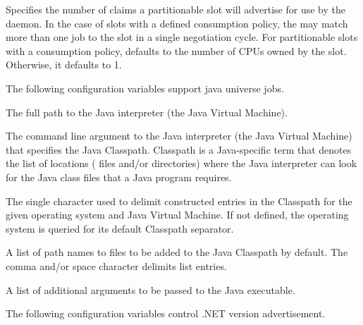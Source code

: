 \begin{description}
\label{param:NumClaims}
\item[\Macro{NUM\_CLAIMS}]
  Specifies the number of claims a partitionable slot will advertise for use
  by the  daemon.  
  In the case of slots with a defined
  consumption policy, the  may match more than one 
  job to the slot in a single negotiation cycle.  
  For partitionable slots with a consumption
  policy,  defaults to the number of CPUs 
  owned by the slot.  
  Otherwise, it defaults to 1.

\end{description}


The following configuration variables support java universe jobs.

\begin{description}
\label{param:Java}
\item[\Macro{JAVA}]
  The full path to the Java interpreter (the Java Virtual Machine).

\label{param:JavaClasspathArgument}
\item[\Macro{JAVA\_CLASSPATH\_ARGUMENT}]
  The command line argument to the Java interpreter (the Java Virtual Machine)
  that specifies the Java Classpath.
  Classpath is a Java-specific term that denotes the list of
  locations ( files and/or directories)
  where the Java interpreter can
  look for the Java class files that a Java program requires.

\label{param:JavaClasspathSeparator}
\item[\Macro{JAVA\_CLASSPATH\_SEPARATOR}]
  The single character used to delimit constructed entries in the
  Classpath for the given operating system and Java Virtual Machine.
  If not defined, the operating system is queried for its default
  Classpath separator.

\label{param:JavaClasspathDefault}
\item[\Macro{JAVA\_CLASSPATH\_DEFAULT}]
  A list of path names to  files to be added to the Java Classpath 
  by default.
  The comma and/or space character delimits list entries.

\label{param:JavaExtraArguments}
\item[\Macro{JAVA\_EXTRA\_ARGUMENTS}]
  A list of additional arguments to be passed to the Java executable.
\end{description}

The following configuration variables control .NET version advertisement.

